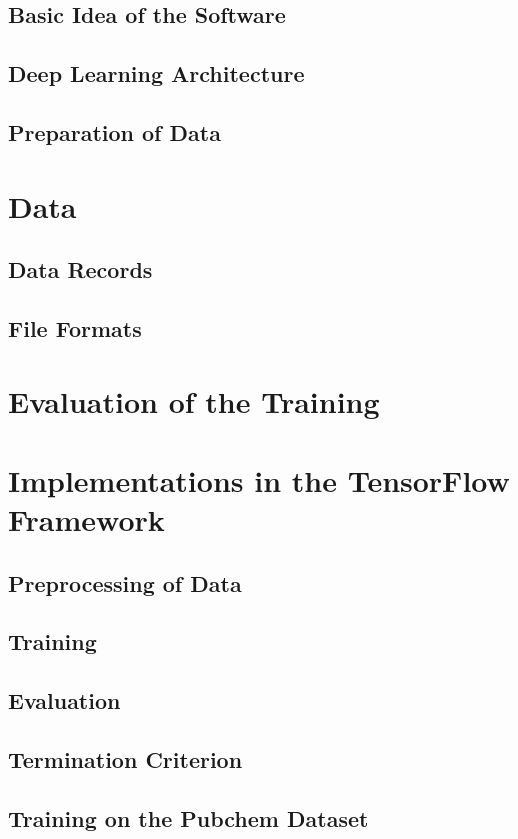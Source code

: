 \documentclass[12pt,a4paper]{report}
\begin{document}
\subsection{Basic Idea of the Software}
\subsection{Deep Learning Architecture}
\subsection{Preparation of Data}

\section{Data}
\subsection{Data Records}
\subsection{File Formats}

\section{Evaluation of the Training}

\section{Implementations in the TensorFlow Framework}
\subsection{Preprocessing of Data}
\subsection{Training}
\subsection{Evaluation}
\subsection{Termination Criterion}
\subsection{Training on the Pubchem Dataset}
\end{document}
